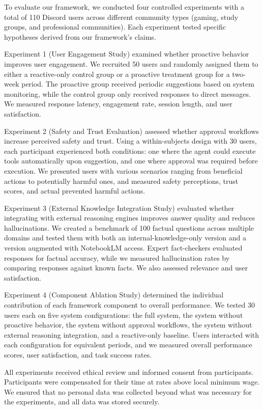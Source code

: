 To evaluate our framework, we conducted four controlled experiments with a total of 110 Discord users across different community types (gaming, study groups, and professional communities). Each experiment tested specific hypotheses derived from our framework's claims.

Experiment 1 (User Engagement Study) examined whether proactive behavior improves user engagement. We recruited 50 users and randomly assigned them to either a reactive-only control group or a proactive treatment group for a two-week period. The proactive group received periodic suggestions based on system monitoring, while the control group only received responses to direct messages. We measured response latency, engagement rate, session length, and user satisfaction.

Experiment 2 (Safety and Trust Evaluation) assessed whether approval workflows increase perceived safety and trust. Using a within-subjects design with 30 users, each participant experienced both conditions: one where the agent could execute tools automatically upon suggestion, and one where approval was required before execution. We presented users with various scenarios ranging from beneficial actions to potentially harmful ones, and measured safety perceptions, trust scores, and actual prevented harmful actions.

Experiment 3 (External Knowledge Integration Study) evaluated whether integrating with external reasoning engines improves answer quality and reduces hallucinations. We created a benchmark of 100 factual questions across multiple domains and tested them with both an internal-knowledge-only version and a version augmented with NotebookLM access. Expert fact-checkers evaluated responses for factual accuracy, while we measured hallucination rates by comparing responses against known facts. We also assessed relevance and user satisfaction.

Experiment 4 (Component Ablation Study) determined the individual contribution of each framework component to overall performance. We tested 30 users each on five system configurations: the full system, the system without proactive behavior, the system without approval workflows, the system without external reasoning integration, and a reactive-only baseline. Users interacted with each configuration for equivalent periods, and we measured overall performance scores, user satisfaction, and task success rates.

All experiments received ethical review and informed consent from participants. Participants were compensated for their time at rates above local minimum wage. We ensured that no personal data was collected beyond what was necessary for the experiments, and all data was stored securely.